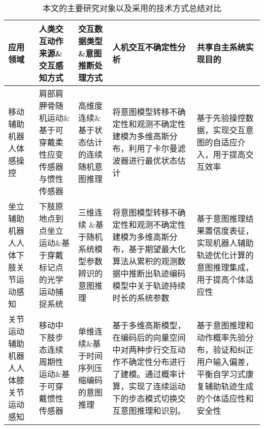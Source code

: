 \begin{table}[htb]
        \centering
        \caption{本文的主要研究对象以及采用的技术方式总结对比}
        \begin{tabular}{p{2cm}p{2cm}p{2cm}p{3.2cm}p{3.2cm}}
        \toprule
                应用领域& 人类交互动作来源\&交互感知方式 & 交互数据类型\&意图推断处理方式 & 人机交互不确定性分析 & 共享自主系统实现目的 \\ 
        \midrule
                移动辅助机器人体感操控 & 肩部肩胛骨随机运动\&基于可穿戴柔性应变传感器与惯性传感器 & 高维度连续\&基于状态估计的连续随机意图推理 &将意图模型转移不确定性和观测不确定性建模为多维高斯分布，利用了卡尔曼滤波器进行最优状态估计 & 基于先验操控数据，实现交互意图的自适应介入，用于提高交互效率\\ 
    
                坐立辅助机器人人体下肢关节运动感知 & 下肢原地点到点坐立运动\&基于穿戴标记点的光学运动捕捉系统 & 三维连续 \&基于随机系统模型参数辨识的意图推理	&将意图模型转移不确定性和观测不确定性建模为多维高斯分布，基于期望最大化算法从累积的观测数据中推断出轨迹编码模型中关于轨迹持续时长的系统参数 & 基于意图推理结果置信度表征，实现机器人辅助轨迹优化计算的意图推理集成，用于提高个体适应性\\ 
    
                关节运动辅助机器人人体膝关节运动感知 & 移动中下肢步态连续周期性运动\&基于可穿戴惯性传感器 & 单维连续\&基于时间序列压缩编码的意图推理	&基于多维高斯模型，在编码后的向量空间中对两种步行交互动作不确定性分布进行了建模。通过概率计算，实现了连续运动下的步态模式切换交互意图推理和识别。& 基于意图推理和动作概率先验分布，验证和纠正用户输入偏差，平衡自学习式康复辅助轨迹生成的个体适应性和安全性\\ 
        \bottomrule
        \end{tabular}
        \label{tab:6-1} 
      \end{table}   
